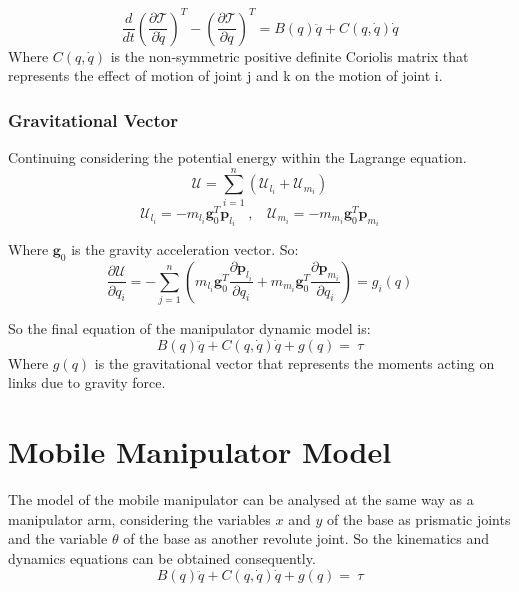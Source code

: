 \begin{equation}
	\frac{d}{dt}\left(\frac{\partial \mathcal{T}}{\partial\dot{q}}\right)^T-\left(\frac{\partial \mathcal{T}}{\partial q}\right)^T=B(q)\ddot{q}+C\left(q,\dot{q}\right)\dot{q}
\end{equation}
Where $C\left(q,\dot{q}\right)$ is the non-symmetric positive definite Coriolis matrix that represents the effect of motion of joint j and k on the motion of joint i. 
\subsubsection{Gravitational Vector}
Continuing considering the potential energy within the Lagrange equation.
\begin{equation*}
	\mathcal{U}=\sum_{i=1}^{n}{(\mathcal{U}_{l_i}+\mathcal{U}_{m_i})}
\end{equation*}
\begin{equation}
	\mathcal{U}_{l_i}=-m_{l_i}\mathbf{g}_0^T\mathbf{p}_{l_i}\ \ \ \ ,\ \ \ \ \mathcal{U}_{m_i}=-m_{m_i}\mathbf{g}_0^T\mathbf{p}_{m_i}
\end{equation}

Where $\mathbf{g}_0$ is the gravity acceleration vector. So:
\begin{equation}
	\frac{\partial \mathcal{U}}{\partial q_i}=-\sum_{j=1}^{n}\left(m_{l_i}\mathbf{g}_0^T\frac{{\partial\mathbf{p}}_{l_i}}{\partial q_i}+m_{m_i}\mathbf{g}_0^T\frac{{\partial\mathbf{p}}_{m_i}}{\partial q_i}\right)=g_i(q)
\end{equation}

So the final equation of the manipulator dynamic model is:
\large\begin{equation}\label{dynamics}
	B\left(q\right)\ddot{q}+C\left(q,\dot{q}\right)\dot{q}+g\left(q\right)=\ \tau
\end{equation}\normalsize
Where $g(q)$ is the gravitational vector that represents the moments acting on links due to gravity force.

\section{Mobile Manipulator Model}
The model of the mobile manipulator can be analysed at the same way as a manipulator arm, considering the variables $x$ and $y$ of the base as prismatic joints and the variable $\theta$ of the base as another revolute joint. 
So the kinematics and dynamics equations can be obtained consequently.
\begin{equation}\label{dynamicsMM}
B\left(q\right)\ddot{q}+C\left(q,\dot{q}\right)\dot{q}+g\left(q\right)=\ \tau
\end{equation}
